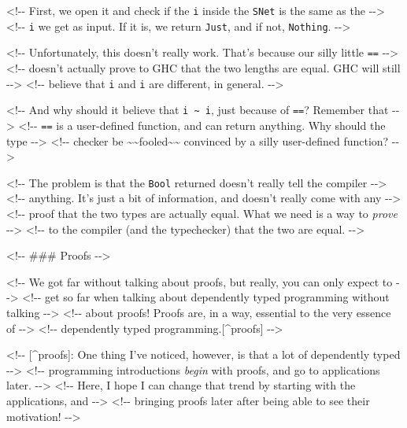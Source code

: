 \documentclass[]{article}
\begin{document}
\textless{}!-\/- First, we open it and check if the \texttt{i\textquotesingle{}}
inside the \texttt{SNet} is the same as the -\/-\textgreater{} \textless{}!-\/-
\texttt{i} we get as input. If it is, we return \texttt{Just}, and if not,
\texttt{Nothing}. -\/-\textgreater{}

\textless{}!-\/- Unfortunately, this doesn't really work. That's because our
silly little \texttt{==} -\/-\textgreater{} \textless{}!-\/- doesn't actually
prove to GHC that the two lengths are equal. GHC will still -\/-\textgreater{}
\textless{}!-\/- believe that \texttt{i} and \texttt{i\textquotesingle{}} are
different, in general. -\/-\textgreater{}

\textless{}!-\/- And why should it believe that
\texttt{i\ \textasciitilde{}\ i\textquotesingle{}}, just because of \texttt{==}?
Remember that -\/-\textgreater{} \textless{}!-\/- \texttt{==} is a user-defined
function, and can return anything. Why should the type -\/-\textgreater{}
\textless{}!-\/- checker be
\textasciitilde{}\textasciitilde{}fooled\textasciitilde{}\textasciitilde{}
convinced by a silly user-defined function? -\/-\textgreater{}

\textless{}!-\/- The problem is that the \texttt{Bool} returned doesn't really
tell the compiler -\/-\textgreater{} \textless{}!-\/- anything. It's just a bit
of information, and doesn't really come with any -\/-\textgreater{}
\textless{}!-\/- proof that the two types are actually equal. What we need is a
way to \emph{prove} -\/-\textgreater{} \textless{}!-\/- to the compiler (and the
typechecker) that the two are equal. -\/-\textgreater{}

\textless{}!-\/- \#\#\# Proofs -\/-\textgreater{}

\textless{}!-\/- We got far without talking about proofs, but really, you can
only expect to -\/-\textgreater{} \textless{}!-\/- get so far when talking about
dependently typed programming without talking -\/-\textgreater{}
\textless{}!-\/- about proofs! Proofs are, in a way, essential to the very
essence of -\/-\textgreater{} \textless{}!-\/- dependently typed
programming.{[}\^{}proofs{]} -\/-\textgreater{}

\textless{}!-\/- {[}\^{}proofs{]}: One thing I've noticed, however, is that a
lot of dependently typed -\/-\textgreater{} \textless{}!-\/- programming
introductions \emph{begin} with proofs, and go to applications later.
-\/-\textgreater{} \textless{}!-\/- Here, I hope I can change that trend by
starting with the applications, and -\/-\textgreater{} \textless{}!-\/- bringing
proofs later after being able to see their motivation! -\/-\textgreater{}
\end{document}
